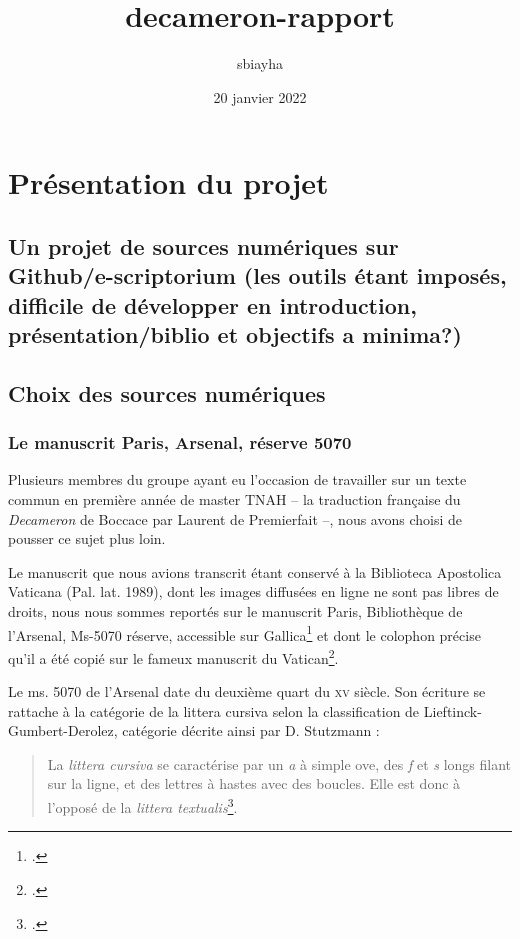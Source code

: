 \documentclass{article}
\title{decameron-rapport}
\author{sbiayha }
\date{20 janvier 2022}
\newcommand{\siecle}[1]{\textsc{#1}\ieme}
\begin{document}
\maketitle

\section{Présentation du projet}
  \subsection{Un projet de sources numériques sur Github/e-scriptorium (les outils étant imposés, difficile de développer en introduction, présentation/biblio et objectifs a minima?)}
  \subsection{Choix des sources numériques}
    
    \subsubsection{Le manuscrit Paris, Arsenal, réserve 5070}

Plusieurs membres du groupe ayant eu l'occasion de travailler sur un texte commun en première année de master TNAH – la traduction française du \textit{Decameron} de Boccace par Laurent de Premierfait –, nous avons choisi de pousser ce sujet plus loin.

Le manuscrit que nous avions transcrit étant conservé à la Biblioteca Apostolica Vaticana (Pal. lat. 1989), dont les images diffusées en ligne ne sont pas libres de droits, nous nous sommes reportés sur le manuscrit Paris, Bibliothèque de l'Arsenal, Ms-5070 réserve, accessible sur Gallica\footcite{texteLivreAppelleDecameron1401} et dont le colophon précise qu'il a été copié sur le fameux manuscrit du Vatican\footcite{institutderechercheetdhistoiredestextesNoticePARISBibliotheque2012a}.

Le ms. 5070 de l'Arsenal date du deuxième quart du \siecle{xv} siècle. Son écriture se rattache à la catégorie de la littera cursiva selon la classification de Lieftinck-Gumbert-Derolez, catégorie décrite ainsi par D. Stutzmann :
\begin{quotation}La \textit{littera cursiva} se caractérise par un \textit{a} à simple ove, des \textit{f} et \textit{s} longs filant sur la ligne, et des lettres à hastes avec des boucles. Elle est donc à l’opposé de la \textit{littera textualis}\footcite{EcrituresGothiquesLivresques2022}.\end{quotation}
\end{document}
